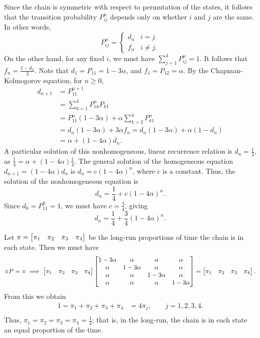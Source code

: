 \documentclass{homework}
\begin{document}
	\begin{alphaparts}
		\questionpart Since the chain is symmetric with respect to permutation of the states, it follows that the transition probability $P^n_{ij}$ depends only on whether $i$ and $j$ are the same. In other words,
		\begin{equation*}
			P^n_{ij} = \begin{cases}
				d_n & i =j \\
				f_n & i \ne j.
			\end{cases}
		\end{equation*}
		On the other hand, for any fixed $i$, we must have $\sum_{j=1}^4 P^n_{ij} = 1$. It follows that $f_n = \frac{1 - d_n}{3}$.
		Note that $d_1 = P_{11} = 1-3\alpha$, and $f_1 = P_{12} = \alpha$. By the Chapman-Kolmogorov equation, for $n \ge 0$,
		\begin{align*}
			d_{n+1} &= P^{n+1}_{11} \\
			&= \sum_{k=1}^4 P^n_{1k}P_{k1} \\
			&= P^n_{11}(1-3\alpha) + \alpha\sum_{k=2}^4 P^{n}_{k1} \\
			&= d_n(1-3\alpha) + 3\alpha f_n = d_n(1-3\alpha) + \alpha(1-d_n) \\
			&=\alpha + (1-4\alpha)d_n. 
		\end{align*}
		A particular solution of this nonhomogeneous, linear recurrence relation is $d_n = \frac{1}{4}$, as $\frac{1}{4} = \alpha + (1-4\alpha)\frac{1}{4}$. The general solution of the homogeneous equation $d_{n+1} = (1-4\alpha)d_n$ is $d_n = c (1-4\alpha)^n$, where $c$ is a constant. Thus, the solution of the nonhomogeneous equation is
		\begin{equation*}
			d_n = \frac{1}{4} + c(1-4\alpha)^n.
		\end{equation*}
		Since $d_0 = P^0_{11} = 1$, we must have $c = \frac{3}{4}$, giving
		\begin{equation*}
			d_n = \frac{1}{4} + \frac{3}{4}(1-4\alpha)^n.
		\end{equation*}
		
		\questionpart Let $\pi = \left[\begin{matrix}\pi_1 & \pi_2 & \pi_3 & \pi_4\end{matrix}\right]$ be the long-run proportions of time the chain is in each state. Then we must have
		\begin{equation*}
			\pi P = \pi \implies \left[\begin{matrix}\pi_1 & \pi_2 & \pi_3 & \pi_4\end{matrix}\right]\left[\begin{matrix}
				1-3\alpha & \alpha & \alpha &\alpha \\
				\alpha & 1-3\alpha & \alpha & \alpha \\
				\alpha & \alpha & 1-3\alpha & \alpha \\
				\alpha & \alpha & \alpha & 1-3\alpha
			\end{matrix}\right] = \left[\begin{matrix}\pi_1 & \pi_2 & \pi_3 & \pi_4\end{matrix}\right].
		\end{equation*}
		From this we obtain
		\begin{align*}
			1 = \pi_1 + \pi_2 + \pi_3 + \pi_4 &= 4\pi_j, \qquad j = 1,2,3,4.\\
		\end{align*}
		Thus, $\pi_1 = \pi_2 = \pi_3 = \pi_4= \frac{1}{4}$; that is, in the long-run, the chain is in each state an equal proportion of the time.
	\end{alphaparts}
	
\end{document}
